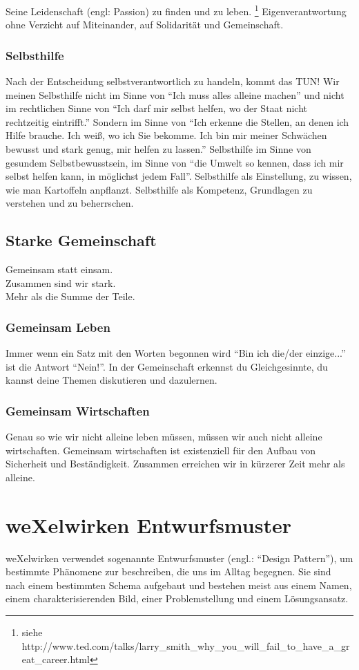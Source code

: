 Seine Leidenschaft (engl: Passion) zu finden und zu leben. \footnote{siehe http://www.ted.com/talks/larry\_smith\_why\_you\_will\_fail\_to\_have\_a\_great\_career.html} 
%
Eigenverantwortung ohne Verzicht auf Miteinander, auf Solidarität und Gemeinschaft.
%

      \subsubsection{Selbsthilfe}
Nach der Entscheidung selbstverantwortlich zu handeln, kommt das TUN!
%
Wir meinen Selbsthilfe nicht im Sinne von "`Ich muss alles alleine machen"' und nicht im rechtlichen Sinne von "`Ich darf mir selbst helfen, wo der Staat nicht rechtzeitig eintrifft."'
%
Sondern im Sinne von "`Ich erkenne die Stellen, an denen ich Hilfe brauche.
%
Ich weiß, wo ich Sie bekomme.
%
Ich bin mir meiner Schwächen bewusst und stark genug, mir helfen zu lassen."'
%
Selbsthilfe im Sinne von gesundem Selbstbewusstsein, im Sinne von "`die Umwelt so kennen, dass ich mir selbst helfen kann, in möglichst jedem Fall"'.
%
Selbsthilfe als Einstellung, zu wissen, wie man Kartoffeln anpflanzt.
%
Selbsthilfe als Kompetenz, Grundlagen zu verstehen und zu beherrschen.

    \subsection{Starke Gemeinschaft}
Gemeinsam statt einsam.\\
Zusammen sind wir stark.\\
Mehr als die Summe der Teile.\\
      \subsubsection{Gemeinsam Leben}
Immer wenn ein Satz mit den Worten begonnen wird "`Bin ich die/der einzige..."' ist die Antwort "`Nein!"'.
%
In der Gemeinschaft erkennst du Gleichgesinnte, du kannst deine Themen diskutieren und dazulernen.
      \subsubsection{Gemeinsam Wirtschaften}
Genau so wie wir nicht alleine leben müssen, müssen wir auch nicht alleine wirtschaften.
%
Gemeinsam wirtschaften ist existenziell für den Aufbau von Sicherheit und Beständigkeit.
%
Zusammen erreichen wir in kürzerer Zeit mehr als alleine.
  \section{weXelwirken Entwurfsmuster}
weXelwirken  verwendet  sogenannte  Entwurfsmuster (engl.:  "`Design  Pattern"'),  um  bestimmte Phänomene zur beschreiben, die uns im Alltag begegnen.
%
Sie sind nach einem bestimmten Schema aufgebaut  und  bestehen  meist  aus  einem  Namen,  einem  charakterisierenden  Bild,  einer Problemstellung und einem Lösungsansatz.



